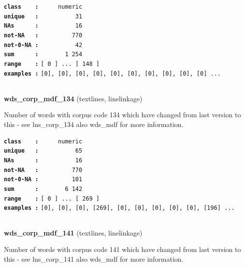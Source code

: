 \documentclass[]{article}
\begin{document}
\textbf{\texttt{class\ \ \ \ :}} \texttt{~~~~~numeric}\\
\textbf{\texttt{unique\ \ \ :}} \texttt{~~~~~~~~~~31}\\
\textbf{\texttt{NAs\ \ \ \ \ \ :}} \texttt{~~~~~~~~~~16}\\
\textbf{\texttt{not-NA\ \ \ :}} \texttt{~~~~~~~~~770}\\
\textbf{\texttt{not-0-NA\ :}} \texttt{~~~~~~~~~~42}\\
\textbf{\texttt{sum\ \ \ \ \ \ :}} \texttt{~~~~~~~1~254}\\
\textbf{\texttt{range\ \ \ \ :}}
\texttt{{[}\ 0\ {]}\ ...\ {[}\ 148\ {]}}\\
\textbf{\texttt{examples\ :}}
\texttt{{[}0{]},\ {[}0{]},\ {[}0{]},\ {[}0{]},\ {[}0{]},\ {[}0{]},\ {[}0{]},\ {[}0{]},\ {[}0{]},\ {[}0{]}\ ...}\\

~

\textbf{wds\_corp\_mdf\_134} (textlines, linelinkage)

Number of words with corpus code 134 which have changed from last
version to this - see lns\_corp\_134 also wds\_mdf for more information.

\textbf{\texttt{class\ \ \ \ :}} \texttt{~~~~~numeric}\\
\textbf{\texttt{unique\ \ \ :}} \texttt{~~~~~~~~~~65}\\
\textbf{\texttt{NAs\ \ \ \ \ \ :}} \texttt{~~~~~~~~~~16}\\
\textbf{\texttt{not-NA\ \ \ :}} \texttt{~~~~~~~~~770}\\
\textbf{\texttt{not-0-NA\ :}} \texttt{~~~~~~~~~101}\\
\textbf{\texttt{sum\ \ \ \ \ \ :}} \texttt{~~~~~~~6~142}\\
\textbf{\texttt{range\ \ \ \ :}}
\texttt{{[}\ 0\ {]}\ ...\ {[}\ 269\ {]}}\\
\textbf{\texttt{examples\ :}}
\texttt{{[}0{]},\ {[}0{]},\ {[}0{]},\ {[}269{]},\ {[}0{]},\ {[}0{]},\ {[}0{]},\ {[}0{]},\ {[}0{]},\ {[}196{]}\ ...}\\

~

\textbf{wds\_corp\_mdf\_141} (textlines, linelinkage)

Number of words with corpus code 141 which have changed from last
version to this - see lns\_corp\_141 also wds\_mdf for more information.
\end{document}
